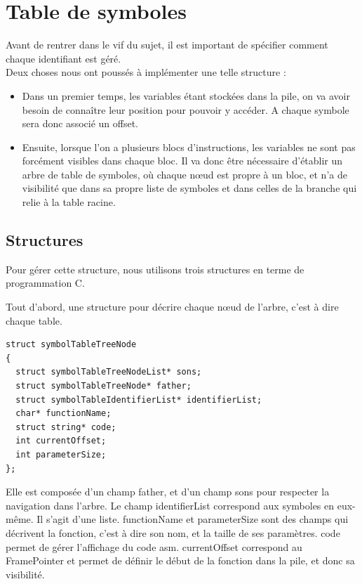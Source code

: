 \section{Table de symboles}

Avant de rentrer dans le vif du sujet, il est important de spécifier comment chaque identifiant est géré.\\ Deux choses nous ont poussés à implémenter une telle structure :
\begin{itemize}
\item Dans un premier temps, les variables étant stockées dans la pile, on va avoir besoin de connaître leur position pour pouvoir y accéder. A chaque symbole sera donc associé un offset.
\item Ensuite, lorsque l'on a plusieurs blocs d'instructions, les variables ne sont pas forcément visibles dans chaque bloc. Il va donc être nécessaire d'établir un arbre de table de symboles, où chaque n\oe{}ud est propre à un bloc, et n'a de visibilité que dans sa propre liste de symboles et dans celles de la branche qui relie à la table racine.
\end{itemize}


\subsection*{Structures}

Pour gérer cette structure, nous utilisons trois structures en terme de programmation C.

Tout d'abord, une structure pour décrire chaque n\oe{}ud de l'arbre, c'est à dire chaque table. 

\begin{verbatim}
struct symbolTableTreeNode
{
  struct symbolTableTreeNodeList* sons;
  struct symbolTableTreeNode* father;
  struct symbolTableIdentifierList* identifierList;
  char* functionName;
  struct string* code;
  int currentOffset;
  int parameterSize;
};
\end{verbatim} 

Elle est composée d'un champ father, et d'un champ sons pour respecter la navigation dans l'arbre. 
Le champ identifierList correspond aux symboles en eux-même. Il s'agit d'une liste. 
functionName et parameterSize sont des champs qui décrivent la fonction, c'est à dire son nom, et la taille de ses paramètres.
code permet de gérer l'affichage du code asm.
currentOffset correspond au FramePointer et permet de définir le début de la fonction dans la pile, et donc sa visibilité.


